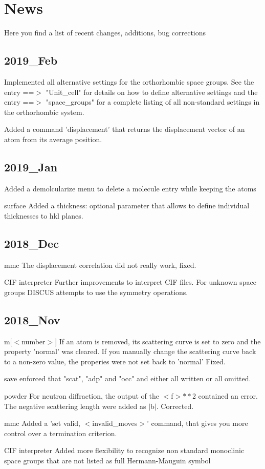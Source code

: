 \section{News}
\par
Here you find a list of recent changes, additions, bug corrections 
\subsection*{2019\_Feb}
\par
Implemented all alternative settings for the orthorhombic space 
groups. See the entry ==$> $ "Unit\_cell" for details on how to 
define alternative settings and the entry ==$> $ "space\_groups" for 
a complete listing of all non-standard settings in the 
orthorhombic system. 
\par
Added a command 'displacement' that returns the displacement 
vector of an atom from its average position. 
\subsection*{2019\_Jan}
\par
Added a demolcularize menu to delete a molecule entry while 
keeping the atoms 
\par
surface 
   Added a thickness: optional parameter that allows to define 
   individual thicknesses to hkl planes. 
\subsection*{2018\_Dec}
\par
mmc 
   The displacement correlation did not really work, fixed. 
\par
CIF interpreter 
   Further improvements to interpret CIF files. For unknown 
   space groups DISCUS attempts to use the symmetry operations. 
\subsection*{2018\_Nov}
\par
m[$ <$number$> $] 
   If an atom is removed, its scattering curve is set to zero and 
   the property 'normal' was cleared. 
   If you manually change the scattering curve back to a non-zero 
   value, the properies were not set back to 'normal' Fixed. 
\par
save 
   enforced that "scat", "adp" and "occ" and either all written 
   or all omitted. 
\par
powder 
   For neutron diffraction, the output of the $ <$f$> $$**$2 contained an 
   error. The negative scattering length were added as $| $b$| $. 
   Corrected. 
\par
mmc 
   Added a 'set valid, $ <$invalid\_moves$> $' command, that gives you more 
   control over a termination criterion. 
\par
CIF interpreter 
   Added more flexibility to recognize non standard monoclinic space 
   groups that are not listed as full Hermann-Mauguin symbol 
